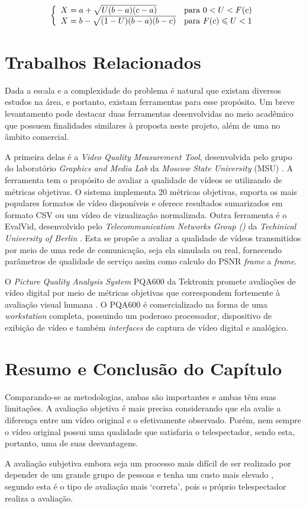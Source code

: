 \[\left\{\begin{array}{l l}
X = a +\sqrt{U(b-a)(c-a)} & \mbox{para } 0 < U < F(c)\\ 
X = b - \sqrt{(1-U)(b-a)(b-c)} & \mbox{para } F(c) \leqslant U < 1
\end{array}\right.\]

\section{Trabalhos Relacionados}

Dada a escala e a complexidade do problema é natural que existam diversos estudos na área, e portanto, existam ferramentas para esse propósito. 
Um breve levantamento pode destacar duas ferramentas desenvolvidas no meio acadêmico que possuem finalidades similares à proposta neste projeto, além de uma no âmbito comercial.

A primeira delas é a  \emph{Video Quality Measurement Tool}, desenvolvida pelo grupo do laboratório \emph{Graphics and Media Lab} da \emph{Moscow State University} (MSU) \cite{moscowuniversity}.
A ferramenta tem o propósito de avaliar a qualidade de vídeos se utilizando de métricas objetivas. 
O sistema implementa 20 métricas objetivas, suporta os mais populares formatos de vídeo disponíveis e oferece resultados sumarizados em formato CSV ou um vídeo de vizualização normalizada.
Outra ferramenta é o EvalVid, desenvolvido pelo \emph{Telecommunication Networks Group ()} da \emph{Techinical University of Berlin} \cite{tuberlin}.
Esta se propõe a avaliar a qualidade de vídeos transmitidos por meio de uma rede de comunicação, seja ela simulada ou real, fornecendo parâmetros de qualidade de serviço assim como calculo do PSNR \emph{frame} a \emph{frame}.

O \emph{Picture Quality Analysis System} PQA600 da Tektronix promete avaliações de vídeo digital por meio de métricas objetivas que correspondem fortemente à avaliação visual humana \cite{tektronix}.
O PQA600 é comercializado na forma de uma \emph{workstation} completa, possuindo um poderoso processador, dispositivo de exibição de vídeo e também \emph{interfaces} de captura de vídeo digital e analógico.

\section{Resumo e Conclusão do Capítulo}

Comparando-se as metodologias, ambas são importantes e ambas têm suas limitações. A avaliação objetiva é mais precisa considerando que ela avalie a diferença entre um vídeo original e o efetivamente observado. Porém, nem sempre o vídeo original possui uma qualidade que satisfaria o telespectador, sendo esta, portanto, uma de suas desvantagens.

A avaliação subjetiva embora seja um processo mais difícil de ser realizado por depender de um grande grupo de pessoas e tenha um custo mais elevado \cite{albini}, segundo \cite{wangbovik2004} esta é o tipo de avaliação mais ‘correta’, pois o próprio telespectador realiza a avaliação.
